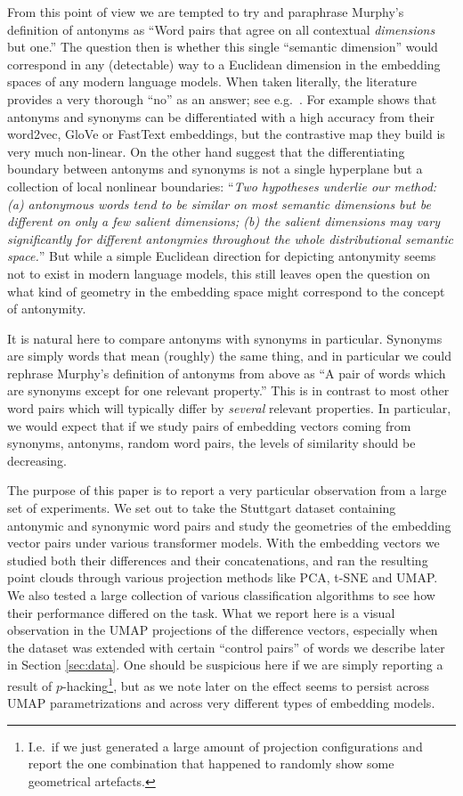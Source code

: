 \documentclass[a4paper]{article}
\theoremstyle{definition}
\theoremstyle{remark}
\numberwithin{equation}{section}
\begin{document}
From this point of view we are tempted to try and paraphrase Murphy's definition of antonyms as ``Word pairs that agree on all contextual \emph{dimensions} but one.'' The question then is whether this single ``semantic dimension'' would correspond in any (detectable) way to a Euclidean dimension in the embedding spaces of any modern language models. When taken literally, the literature provides a very thorough ``no'' as an answer; see e.g.\ \cite{ali2019antonym,glavavs2018discriminating,samenko2021intuitive,xie2021mixture}.
For example \cite{samenko2021intuitive} shows that antonyms and synonyms can be differentiated with a high accuracy from their word2vec, GloVe or FastText embeddings, but the contrastive map they build is very much non-linear. On the other hand \cite{xie2021mixture} suggest that the differentiating boundary between antonyms and synonyms is not a single hyperplane but a collection of local nonlinear boundaries: ``\emph{Two hypotheses underlie our method: (a) antonymous words tend to be
similar on most semantic dimensions but be different on only a few salient dimensions; (b) the salient dimensions may vary significantly for different antonymies throughout the whole distributional semantic space.}'' But while a simple Euclidean direction for depicting antonymity seems not to exist in modern language models, this still leaves open the question on what kind of geometry in the embedding space might correspond to the concept of antonymity.

It is natural here to compare antonyms with synonyms in particular. Synonyms are simply words that mean (roughly) the same thing, and in particular we could rephrase Murphy's definition of antonyms from above as ``A pair of words which are synonyms except for one relevant property.'' This is in contrast to most other word pairs which will typically differ by \emph{several} relevant properties. In particular, we would expect that if we study pairs of embedding vectors coming from synonyms, antonyms, random word pairs, the levels of similarity should be decreasing.

The purpose of this paper is to report a very particular observation from a large set of experiments. We set out to take the Stuttgart dataset \cite{nguyen2017distinguishing} containing antonymic and synonymic word pairs and study the geometries of the embedding vector pairs under various transformer models.
With the embedding vectors we studied both their differences and their concatenations, and ran the resulting point clouds through various projection methods like PCA, t-SNE and UMAP. We also tested a large collection of various classification algorithms to see how their performance differed on the task. What we report here is a visual observation in the UMAP projections of the difference vectors, especially when the dataset was extended with certain ``control pairs'' of words we describe later in Section \ref{sec:data}. One should be suspicious here if we are simply reporting a result of $p$-hacking\footnote{I.e.\ if we just generated a large amount of projection configurations and report the one combination that happened to randomly show some geometrical artefacts.}, but as we note later on the effect seems to persist across UMAP parametrizations and across very different types of embedding models.
\end{document}
